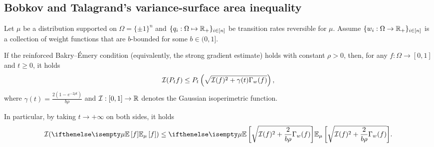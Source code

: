 \subsection{Bobkov and Talagrand's variance-surface area inequality}
\begin{theorem}\label{lem:local_bobkov}
    Let $\mu$ be a distribution supported on $\Omega = \{\pm 1\}^n$ and $\{q_i: \Omega \mapsto \mathbb{R}_+\}_{i\in[n]}$ be transition rates reversible for $\mu$.
    Assume $\{w_i:\Omega \to \mathbb{R}_+\}_{i\in[n]}$ is a collection of weight functions that are $b$-bounded for some $b \in (0,1]$. 
    
    If the reinforced Bakry--\'Emery condition (equivalently, the strong gradient estimate) holds with constant $\rho > 0$,
    then, for any $f:\Omega \to [0,1]$ and $t\geq 0$, it holds
    \begin{align}\label{eq:local_bobkov}
        \mathcal{I}(P_t f)\leq P_t\left(\sqrt{\mathcal{I}(f)^2 + \gamma(t) \Gamma_w(f)}\right),
    \end{align}
    where $\gamma(t) = \frac{2(1-e^{-2\rho t})}{b \rho}$ and $\mathcal{I}:[0,1] \to \mathbb{R}$ denotes the Gaussian isoperimetric function.

    In particular, by taking $t \to +\infty$ on both sides, it holds
    \begin{align*}
        \+I(\E[\mu]{f}) \le \E[\mu]{\sqrt{\+I(f)^2 + \frac{2}{b \rho} \Gamma_w(f)}}.
    \end{align*}
\end{theorem}


